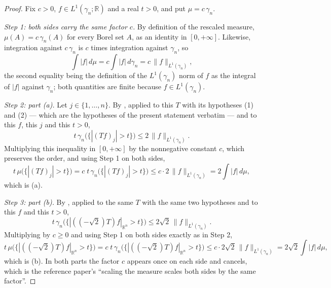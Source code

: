 \begin{proof}
Fix $c > 0$, $f \in L^1(\gamma_n;\mathbb{R})$ and a real $t > 0$, and put
$\mu = c\,\gamma_n$.

\emph{Step 1: both sides carry the same factor $c$.}
By definition of the rescaled measure, $\mu(A) = c\,\gamma_n(A)$ for every Borel
set $A$, as an identity in $[0,+\infty]$.  Likewise, integration against
$c\,\gamma_n$ is $c$ times integration against $\gamma_n$, so
\begin{equation*}
  \int |f| \, d\mu = c \int |f| \, d\gamma_n = c\,\|f\|_{L^1(\gamma_n)} ,
  \tag{1}
\end{equation*}
the second equality being the definition of the $L^1(\gamma_n)$ norm of $f$ as
the integral of $|f|$ against $\gamma_n$; both quantities are finite because
$f \in L^1(\gamma_n)$.

\emph{Step 2: part (a).}
Let $j \in \{1,\ldots,n\}$.  By , applied to
this $T$ with its hypotheses (1) and (2) --- which are the hypotheses of the
present statement verbatim --- and to this $f$, this $j$ and this $t > 0$,
\[
  t\,\gamma_n\bigl(\{|(Tf)_j| > t\}\bigr) \leq 2\,\|f\|_{L^1(\gamma_n)} .
\]
Multiplying this inequality in $[0,+\infty]$ by the nonnegative constant $c$,
which preserves the order, and using Step 1 on both sides,
\[
  t\,\mu\bigl(\{|(Tf)_j| > t\}\bigr)
    = c\;t\,\gamma_n\bigl(\{|(Tf)_j| > t\}\bigr)
    \leq c \cdot 2\,\|f\|_{L^1(\gamma_n)}
    = 2 \int |f| \, d\mu ,
\]
which is (a).

\emph{Step 3: part (b).}
By , applied to the same $T$ with the same
two hypotheses and to this $f$ and this $t > 0$,
\[
  t\,\gamma_n\bigl(\{|((-\sqrt2)T)f|_{\mathbb{R}^n} > t\}\bigr)
    \leq 2\sqrt2\,\|f\|_{L^1(\gamma_n)} .
\]
Multiplying by $c \geq 0$ and using Step 1 on both sides exactly as in Step 2,
\[
  t\,\mu\bigl(\{|((-\sqrt2)T)f|_{\mathbb{R}^n} > t\}\bigr)
    = c\;t\,\gamma_n\bigl(\{|((-\sqrt2)T)f|_{\mathbb{R}^n} > t\}\bigr)
    \leq c \cdot 2\sqrt2\,\|f\|_{L^1(\gamma_n)}
    = 2\sqrt2 \int |f| \, d\mu ,
\]
which is (b).  In both parts the factor $c$ appears once on each side and
cancels, which is the reference paper's ``scaling the measure scales both sides
by the same factor''.
\end{proof}
